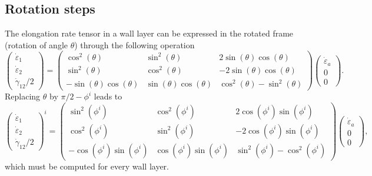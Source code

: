 \documentclass[]{article}
\begin{document}
\subsection{Rotation steps}
The elongation rate tensor in a wall layer can be expressed in the rotated frame (rotation of angle $\theta$) through the following operation
\begin{equation}
	\left(\begin{matrix}
		\dot{\varepsilon}_1\\
		\dot{\varepsilon}_2\\
		\dot{\gamma}_{12}/2
	\end{matrix}\right)
=
	\left(\begin{matrix}
	\cos^2(\theta) & \sin^2(\theta) & 2\sin(\theta)\cos(\theta)\\
	\sin^2(\theta) & \cos^2(\theta) & -2\sin(\theta)\cos(\theta)\\
	-\sin(\theta)\cos(\theta) & \sin(\theta)\cos(\theta) & \cos^2(\theta)-\sin^2(\theta)
\end{matrix}\right)
\left(\begin{matrix}
	\dot{\varepsilon}_a\\
	0\\
	0
\end{matrix}\right).
\end{equation}
Replacing $\theta$ by $\pi/2-\phi^i$ leads to
\begin{equation}
	\boxed{
	\left(\begin{matrix}
		\dot{\varepsilon}_1\\
		\dot{\varepsilon}_2\\
		\dot{\gamma}_{12}/2
	\end{matrix}\right)^i
	=
	\left(\begin{matrix}
		\sin^2(\phi^i) & \cos^2(\phi^i) & 2\cos(\phi^i)\sin(\phi^i)\\
		\cos^2(\phi^i) & \sin^2(\phi^i) & -2\cos(\phi^i)\sin(\phi^i)\\
		-\cos(\phi^i)\sin(\phi^i) & \cos(\phi^i)\sin(\phi^i) & \sin^2(\phi^i)-\cos^2(\phi^i)
	\end{matrix}\right)
	\left(\begin{matrix}
		\dot{\varepsilon}_a\\
		0\\
		0
	\end{matrix}\right)},
\end{equation}
which must be computed for every wall layer.
\end{document}
